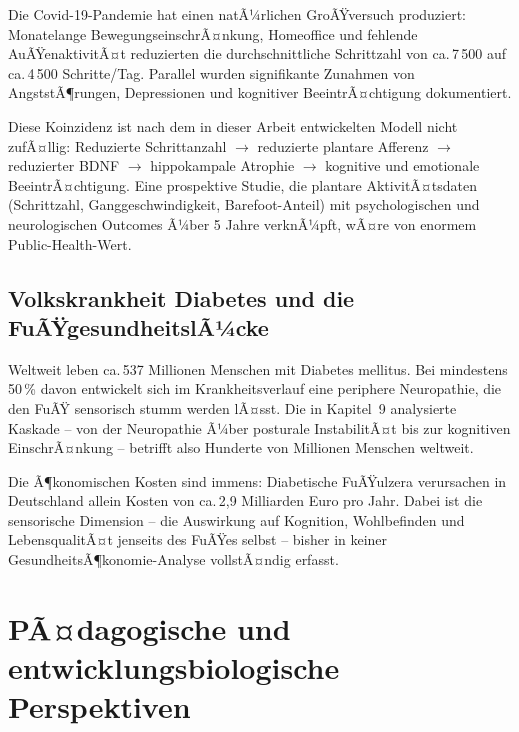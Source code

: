 ﻿\documentclass[12pt,a4paper]{report}
\theoremstyle{plain}
\theoremstyle{definition}
\theoremstyle{remark}
\begin{document}
Die Covid-19-Pandemie hat einen natÃ¼rlichen GroÃŸversuch produziert:
Monatelange BewegungseinschrÃ¤nkung, Homeoffice und fehlende
AuÃŸenaktivitÃ¤t reduzierten die durchschnittliche Schrittzahl von
ca.\,7\,500 auf ca.\,4\,500 Schritte/Tag. Parallel wurden
signifikante Zunahmen von AngststÃ¶rungen, Depressionen und
kognitiver BeeintrÃ¤chtigung dokumentiert.

Diese Koinzidenz ist nach dem in dieser Arbeit entwickelten Modell
nicht zufÃ¤llig: Reduzierte Schrittanzahl $\to$ reduzierte plantare
Afferenz $\to$ reduzierter BDNF $\to$ hippokampale Atrophie $\to$
kognitive und emotionale BeeintrÃ¤chtigung. Eine prospektive Studie,
die plantare AktivitÃ¤tsdaten (Schrittzahl, Ganggeschwindigkeit,
Barefoot-Anteil) mit psychologischen und neurologischen Outcomes
Ã¼ber 5 Jahre verknÃ¼pft, wÃ¤re von enormem Public-Health-Wert.

\subsection{Volkskrankheit Diabetes und die FuÃŸgesundheitslÃ¼cke}

Weltweit leben ca.\,537 Millionen Menschen mit Diabetes mellitus.
Bei mindestens 50\,\% davon entwickelt sich im Krankheitsverlauf
eine periphere Neuropathie, die den FuÃŸ sensorisch stumm werden
lÃ¤sst. Die in Kapitel~9 analysierte Kaskade -- von der Neuropathie
Ã¼ber posturale InstabilitÃ¤t bis zur kognitiven EinschrÃ¤nkung --
betrifft also Hunderte von Millionen Menschen weltweit.

Die Ã¶konomischen Kosten sind immens: Diabetische FuÃŸulzera
verursachen in Deutschland allein Kosten von ca.\,2,9 Milliarden
Euro pro Jahr. Dabei ist die sensorische Dimension -- die
Auswirkung auf Kognition, Wohlbefinden und LebensqualitÃ¤t jenseits
des FuÃŸes selbst -- bisher in keiner GesundheitsÃ¶konomie-Analyse
vollstÃ¤ndig erfasst.

\section{PÃ¤dagogische und entwicklungsbiologische Perspektiven}
\end{document}
